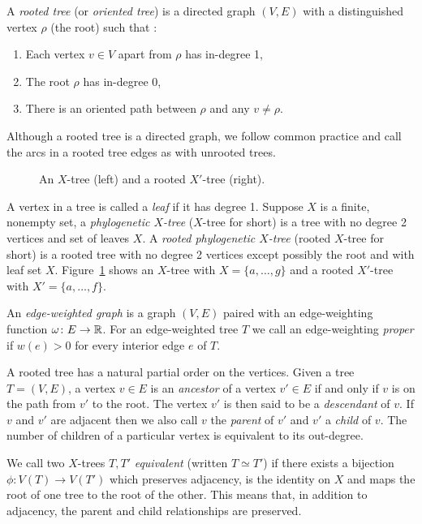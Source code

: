 A \textit{rooted tree} (or \textit{oriented tree}) is a directed graph $(V,E)$
with a distinguished vertex $\rho$ (the root) such that \cite{knuth97taocp1}:
\begin{enumerate}[label=\alph*)]
\item Each vertex $v \in V$ apart from $\rho$ has in-degree 1,
\item The root $\rho$ has in-degree 0,
\item There is an oriented path between $\rho$ and any $v \neq \rho$.
\end{enumerate}
Although a rooted tree is a directed graph, we follow common practice and call
the arcs in a rooted tree edges as with unrooted trees.

\begin{figure}
  \centering
  
  \caption{An $X$-tree (left) and a rooted $X'$-tree (right).}
  \label{fig:x-tree-ex}
\end{figure}

A vertex in a tree is called a \textit{leaf} if it has degree 1.  Suppose $X$
is a finite, nonempty set, a \textit{phylogenetic $X$-tree} ($X$-tree for
short) is a tree with no degree 2 vertices and set of leaves $X$.  A
\textit{rooted phylogenetic $X$-tree} (rooted $X$-tree for short) is a rooted
tree with no degree 2 vertices except possibly the root and with leaf set
$X$.  Figure~\ref{fig:x-tree-ex} shows an $X$-tree with $X = \{a,\dotsc,g\}$
and a rooted $X'$-tree with $X' = \{a,\dotsc,f\}$.

An \textit{edge-weighted graph} is a graph $(V,E)$ paired with an
edge-weighting function $\omega \colon E \to {\mathbb R}$.  For an edge-weighted tree
$T$ we call an edge-weighting \textit{proper} if $w(e) > 0$ for every interior
edge $e$ of $T$.

A rooted tree has a natural partial order on the vertices.  Given a tree
$T=(V,E)$, a vertex $v \in E$ is an \textit{ancestor} of a vertex $v' \in E$
if and only if $v$ is on the path from $v'$ to the root.  The vertex $v'$ is
then said to be a \textit{descendant} of $v$.  If $v$ and $v'$ are adjacent
then we also call $v$ the \textit{parent} of $v'$ and $v'$ a \textit{child} of
$v$.  The number of children of a particular vertex is equivalent to its
out-degree.

We call two $X$-trees $T,T'$ \textit{equivalent} (written $T \simeq T'$) if
there exists a bijection $\phi \colon V(T) \to V(T')$ which preserves
adjacency, is the identity on $X$ and maps the root of one tree to the root of
the other.  This means that, in addition to adjacency, the parent and child
relationships are preserved.

